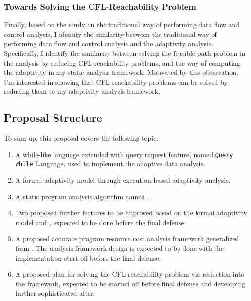 \subsubsection{Towards Solving the CFL-Reachability Problem}
\label{subsec:intro-cfl}

Finally, based on the study on the traditional way of performing data flow and control analysis,
I identify the similarity between the traditional way of performing data flow and control analysis and the 
 adaptivity analysis. 
 Specifically, I identify the similarity between 
 solving the feasible path problem in the analysis by reducing CFL-reachability problems,
 and the way of computing the adaptivity in my static analysis framework.
 Motivated by this observation, 
 I'm interested in showing that
 CFL-reachability problems can be solved by reducing them to my adaptivity analysis framework.


\subsection{Proposal Structure}
\label{subsec:intro-structure}

To sum up, this proposal covers the following topic.
\begin{enumerate}
\item A while-like language extended with query request feature, named {\tt Query While} Language, 
used to implement 
the adaptive data analysis.
\item A formal adaptivity model through execution-based adaptivity analysis.
\item A static program analysis algorithm named {\THESYSTEM}.
\item Two proposed further features to be improved based on the formal adaptivity model and {\THESYSTEM},
 expected to be done before the final defense.
\item A proposed accurate program resource cost analysis framework generalized from {\THESYSTEM}. 
The analysis framework design is expected to be done with the implementation start off before the final defense.
\item A proposed plan for solving the CFL-reachability problem via reduction into the {\THESYSTEM} framework,
expected to be started off before final defense and developing further sophisticated after.
\end{enumerate}